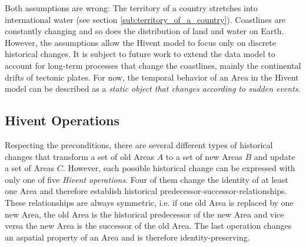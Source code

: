 Both assumptions are wrong: The territory of a country stretches into international water (see section \ref{sub:territory_of_a_country}). Coastlines are constantly changing and so does the distribution of land and water on Earth. However, the assumptions allow the Hivent model to focus only on discrete historical changes. It is subject to future work to extend the data model to account for long-term processes that change the coastlines, mainly the continental drifts of tectonic plates. For now, the temporal behavior of an Area in the Hivent model can be described as a \emph{static object that changes according to sudden events}.



\subsection{Hivent Operations} %
\label{sub:hivent_operations}

Respecting the preconditions, there are several different types of historical changes that transform a set of old Areas $A$ to a set of new Areas $B$ and update a set of Areas $C$. However, each possible historical change can be expressed with only one of five \emph{Hivent operations}. Four of them change the identity of at least one Area and therefore establish historical predecessor-successor-relationships. These relationships are always symmetric, i.e. if one old Area is replaced by one new Area, the old Area is the historical predecessor of the new Area and vice versa the new Area is the successor of the old Area. The last operation changes an aspatial property of an Area and is therefore identity-preserving.

